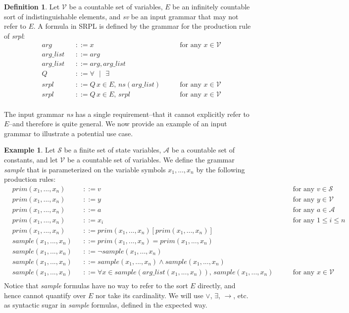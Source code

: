 \documentclass[12pt]{article}
\theoremstyle{definition}
\newtheorem{definition}{Definition}
\newtheorem{example}{Example}
\theoremstyle{remark}
\newcommand{\st}{\text{ }|\text{ }}
\begin{document}
\begin{definition}
  Let $\mathcal{V}$ be a countable set of variables, $E$ be an infinitely countable sort of indistinguishable elements, and \textit{sv} be an input grammar that may not refer to $E$.  A formula in SRPL is defined by the grammar for the production rule of \textit{srpl}:
  \begin{align*}
    &arg& &::= x \qquad &\text{for any } x \in \mathcal{V}\\
    &arg\_list& &::= arg\\
    &arg\_list& &::= arg,arg\_list\\
    &Q& &::= \forall \st \exists\\
    &srpl& &::= Q \, x \in E, \, ns(arg\_list) \qquad &\text{for any } x \in \mathcal{V}\\
    &srpl& &::= Q \, x \in E, \, srpl \qquad &\text{for any } x \in \mathcal{V}\\
  \end{align*}
\end{definition}

The input grammar \textit{ns} has a single requirement--that it cannot explicitly refer to $E$--and therefore is quite general.  We now provide an example of an input grammar to illustrate a potential use case.

\begin{example}
  Let $\mathcal{S}$ be a finite set of state variables, $\mathcal{A}$ be a countable set of constants, and let $\mathcal{V}$ be a countable set of variables.  We define the grammar \textit{sample} that is parameterized on the variable symbols $x_1,...,x_n$ by the following production rules:
  \begin{align*}
    &prim(x_1,...,x_n)& &::= v \qquad &\text{for any } v \in \mathcal{S}\\
    &prim(x_1,...,x_n)& &::= y \qquad &\text{for any } y \in \mathcal{V}\\
    &prim(x_1,...,x_n)& &::= a \qquad &\text{for any } a \in \mathcal{A}\\
    &prim(x_1,...,x_n)& &::= x_i \qquad &\text{for any } 1 \leq i \leq n\\
    &prim(x_1,...,x_n)& &::= prim(x_1,...,x_n)[prim(x_1,...,x_n)]\\
    &sample(x_1,...,x_n)& &::= prim(x_1,...,x_n) = prim(x_1,...,x_n)\\
    &sample(x_1,...,x_n)& &::= \neg sample(x_1,...,x_n)\\
    &sample(x_1,...,x_n)& &::= sample(x_1,...,x_n) \land sample(x_1,...,x_n)\\
    &sample(x_1,...,x_n)& &::= \forall x \in sample(arg\_list(x_1,...,x_n)), \, sample(x_1,...,x_n) \qquad &\text{for any } x \in \mathcal{V}\\
  \end{align*}
  Notice that \textit{sample} formulas have no way to refer to the sort $E$ directly, and hence cannot quantify over $E$ nor take its cardinality.  We will use $\lor$, $\exists$, $\rightarrow$, etc. as syntactic sugar in \textit{sample} formulas, defined in the expected way.
\end{example}
\end{document}
